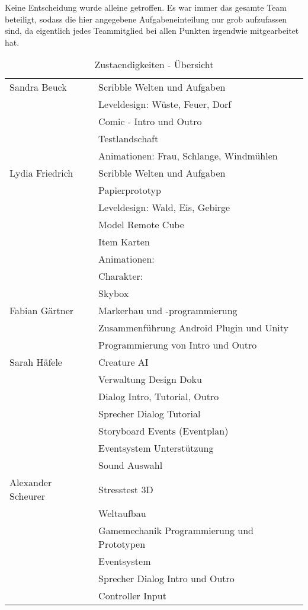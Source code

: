 
Keine Entscheidung wurde alleine getroffen. Es war immer das gesamte Team beteiligt, sodass die hier angegebene Aufgabeneinteilung nur grob aufzufassen sind, da eigentlich jedes Teammitglied bei allen Punkten irgendwie mitgearbeitet hat.

\begin{table}[!htbp] %
\begin{center}
\begin{tabular}[hc]{l|l}
\hline
Sandra Beuck & Scribble Welten und Aufgaben\\
& Leveldesign: Wüste, Feuer, Dorf\\
& Comic - Intro und Outro\\
& Testlandschaft\\
& Animationen: Frau, Schlange, Windmühlen\\
\hline
Lydia Friedrich & Scribble Welten und Aufgaben\\
& Papierprototyp\\
& Leveldesign: Wald, Eis, Gebirge\\
& Model Remote Cube\\
& Item Karten\\
& Animationen:\\
& Charakter:\\
& Skybox\\
\hline
Fabian Gärtner & Markerbau und -programmierung\\
& Zusammenführung Android Plugin und Unity\\
& Programmierung von Intro und Outro\\
\hline
Sarah Häfele & Creature AI\\
& Verwaltung Design Doku\\
& Dialog Intro, Tutorial, Outro\\
& Sprecher Dialog Tutorial\\
& Storyboard Events (Eventplan)\\
& Eventsystem Unterstützung\\
& Sound Auswahl\\
\hline
Alexander Scheurer & Stresstest 3D\\
& Weltaufbau\\
& Gamemechanik Programmierung und Prototypen\\
& Eventsystem\\
& Sprecher Dialog Intro und Outro\\
& Controller Input\\
\end{tabular}
\caption{Zustaendigkeiten - Übersicht}
\label{tab:aufgaben}
\end{center}
\end{table}